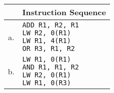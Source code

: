 \documentclass[11pt, dvipsnames, svgnames, x11names]{article}
\begin{document}
\begin{latin}
\begin{table}[H]
\begin{center}
\begin{tabular}{|c|l|}
\hline
& Instruction Sequence \\
\hline
a. &
\makecell[l]{
\texttt{ADD R1, R2, R1} \\ 
\texttt{LW R2, 0(R1)} \\ 
\texttt{LW R1, 4(R1)} \\
\texttt{OR R3, R1, R2}} \\ 
\hline
b. &
\makecell[l]{
\texttt{LW R1, 0(R1)} \\ 
\texttt{AND R1, R1, R2} \\ 
\texttt{LW R2, 0(R1)} \\
\texttt{LW R1, 0(R3)}}\\
\hline
\end{tabular}
\end{center}
\end{table}
\end{latin}
\end{document}
